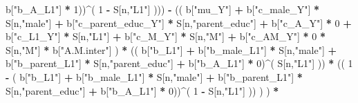 \documentclass[
]{book}
\newenvironment{Shaded}{\begin{snugshade}}{\end{snugshade}}
\newcommand{\DecValTok}[1]{\textcolor[rgb]{0.00,0.00,0.81}{#1}}
\newcommand{\NormalTok}[1]{#1}
\newcommand{\SpecialCharTok}[1]{\textcolor[rgb]{0.81,0.36,0.00}{\textbf{#1}}}
\newcommand{\StringTok}[1]{\textcolor[rgb]{0.31,0.60,0.02}{#1}}
\begin{document}
\begin{Shaded}
\begin{Highlighting}[]
\NormalTok{                                 b[}\StringTok{"b\_A\_L1"}\NormalTok{] }\SpecialCharTok{*} \DecValTok{1}\NormalTok{))}\SpecialCharTok{\^{}}\NormalTok{( }\DecValTok{1} \SpecialCharTok{{-}}\NormalTok{ S[n,}\StringTok{"L1"}\NormalTok{] ))) }\SpecialCharTok{{-}} 
\NormalTok{                      (( b[}\StringTok{"mu\_Y"}\NormalTok{] }\SpecialCharTok{+} 
\NormalTok{                          b[}\StringTok{"c\_male\_Y"}\NormalTok{] }\SpecialCharTok{*}\NormalTok{ S[n,}\StringTok{"male"}\NormalTok{] }\SpecialCharTok{+} 
\NormalTok{                          b[}\StringTok{"c\_parent\_educ\_Y"}\NormalTok{] }\SpecialCharTok{*}\NormalTok{ S[n,}\StringTok{"parent\_educ"}\NormalTok{] }\SpecialCharTok{+} 
\NormalTok{                          b[}\StringTok{"c\_A\_Y"}\NormalTok{] }\SpecialCharTok{*} \DecValTok{0} \SpecialCharTok{+} 
\NormalTok{                          b[}\StringTok{"c\_L1\_Y"}\NormalTok{] }\SpecialCharTok{*}\NormalTok{ S[n,}\StringTok{"L1"}\NormalTok{] }\SpecialCharTok{+}
\NormalTok{                          b[}\StringTok{"c\_M\_Y"}\NormalTok{] }\SpecialCharTok{*}\NormalTok{ S[n,}\StringTok{"M"}\NormalTok{] }\SpecialCharTok{+}
\NormalTok{                          b[}\StringTok{"c\_AM\_Y"}\NormalTok{] }\SpecialCharTok{*} \DecValTok{0} \SpecialCharTok{*}\NormalTok{ S[n,}\StringTok{"M"}\NormalTok{] }\SpecialCharTok{*}\NormalTok{ b[}\StringTok{"A.M.inter"}\NormalTok{] ) }\SpecialCharTok{*}
\NormalTok{                      (( b[}\StringTok{"b\_L1"}\NormalTok{] }\SpecialCharTok{+}
\NormalTok{                           b[}\StringTok{"b\_male\_L1"}\NormalTok{] }\SpecialCharTok{*}\NormalTok{ S[n,}\StringTok{"male"}\NormalTok{] }\SpecialCharTok{+}  
\NormalTok{                           b[}\StringTok{"b\_parent\_L1"}\NormalTok{] }\SpecialCharTok{*}\NormalTok{ S[n,}\StringTok{"parent\_educ"}\NormalTok{] }\SpecialCharTok{+}
\NormalTok{                           b[}\StringTok{"b\_A\_L1"}\NormalTok{] }\SpecialCharTok{*} \DecValTok{0}\NormalTok{)}\SpecialCharTok{\^{}}\NormalTok{( S[n,}\StringTok{"L1"}\NormalTok{] )) }\SpecialCharTok{*}
\NormalTok{                      (( }\DecValTok{1} \SpecialCharTok{{-}}\NormalTok{ ( b[}\StringTok{"b\_L1"}\NormalTok{] }\SpecialCharTok{+}
\NormalTok{                                 b[}\StringTok{"b\_male\_L1"}\NormalTok{] }\SpecialCharTok{*}\NormalTok{ S[n,}\StringTok{"male"}\NormalTok{] }\SpecialCharTok{+}  
\NormalTok{                                 b[}\StringTok{"b\_parent\_L1"}\NormalTok{] }\SpecialCharTok{*}\NormalTok{ S[n,}\StringTok{"parent\_educ"}\NormalTok{] }\SpecialCharTok{+}
\NormalTok{                                 b[}\StringTok{"b\_A\_L1"}\NormalTok{] }\SpecialCharTok{*} \DecValTok{0}\NormalTok{))}\SpecialCharTok{\^{}}\NormalTok{( }\DecValTok{1} \SpecialCharTok{{-}}\NormalTok{ S[n,}\StringTok{"L1"}\NormalTok{] )) ) ) }\SpecialCharTok{*}

\end{Highlighting}
\end{Shaded}
\end{document}
